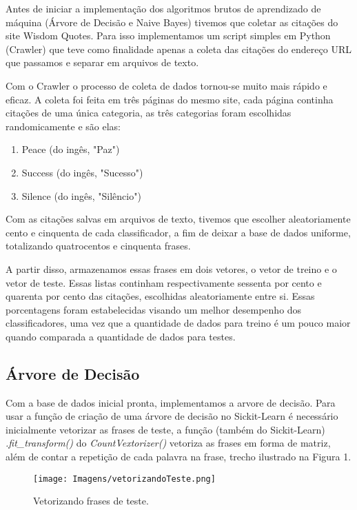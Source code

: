 \documentclass[preprint,12pt,times]{elsarticle}
\begin{document}
	Antes de iniciar a implementação dos algoritmos brutos de aprendizado de máquina (Árvore de Decisão e Naive Bayes) tivemos que coletar as citações do site Wisdom Quotes. Para isso implementamos um script simples em Python (Crawler) que teve como finalidade apenas a coleta das citações do endereço URL que passamos e separar em arquivos de texto. 
	
	Com o Crawler o processo de coleta de dados tornou-se muito mais rápido e eficaz.
	A coleta foi feita em três páginas do mesmo site, cada página continha citações de uma única categoria, as três categorias foram escolhidas randomicamente e são elas:
	
	\begin{enumerate}
		\item Peace (do ingês, "Paz")
		\item Success (do ingês, "Sucesso")
		\item Silence (do ingês, "Silêncio")
	\end{enumerate}
	
	Com as citações salvas em arquivos de texto, tivemos que escolher aleatoriamente cento e cinquenta de cada classificador, a fim de deixar a base de dados uniforme, totalizando quatrocentos e cinquenta frases.
	
	A partir disso, armazenamos essas frases em dois vetores, o vetor de treino e o vetor de teste. Essas listas continham respectivamente sessenta por cento e quarenta por cento das citações, escolhidas aleatoriamente entre si. Essas porcentagens foram estabelecidas visando um melhor desempenho dos classificadores, uma vez que a quantidade de dados para treino é um pouco maior quando comparada a quantidade de dados para testes.
	
	\subsection{Árvore de Decisão}
	
	Com a base de dados inicial pronta, implementamos a arvore de decisão. Para usar a função de criação de uma árvore de decisão no Sickit-Learn é necessário inicialmente vetorizar as frases de teste, a função (também do Sickit-Learn) \textit{.fit\_transform()} do \textit{CountVextorizer()} vetoriza as frases em forma de matriz, além de contar a repetição de cada palavra na frase, trecho ilustrado na Figura 1. 
	
	\begin{figure}[h]
		\centering\texttt{[image: Imagens/vetorizandoTeste.png]}
		\caption{Vetorizando frases de teste.}
	\end{figure}
	
\end{document}
